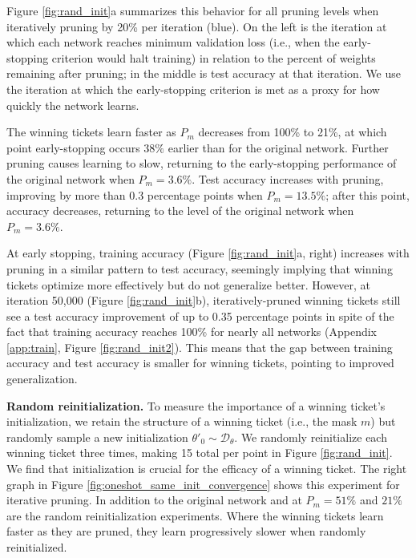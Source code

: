 Figure \ref{fig:rand_init}a summarizes this behavior for all pruning levels when iteratively pruning by 20\% per iteration (blue).
On the left is the iteration at which each network reaches minimum validation loss (i.e., when the early-stopping criterion would halt training)
in relation to the percent of weights remaining after pruning; in the middle is test accuracy at that iteration. We use the iteration at which
the early-stopping criterion is met as a proxy for how quickly the network learns.

The winning tickets learn faster as $P_m$ decreases from 100\% to 21\%, at which point
early-stopping occurs $38\%$ earlier than for the original network. Further pruning causes
learning to slow, returning to the early-stopping performance of the original network when $P_m = 3.6\%$.
Test accuracy increases with pruning, improving by more than 0.3 percentage points when $P_m = 13.5\%$; after this point, accuracy decreases, returning to the level of the original network when $P_m = 3.6\%$.

At early stopping, training accuracy (Figure \ref{fig:rand_init}a, right) increases with pruning in a similar pattern to test accuracy, seemingly implying that winning tickets
optimize more effectively but do not generalize better.  However, at iteration 50,000 (Figure \ref{fig:rand_init}b),
iteratively-pruned winning tickets still see a test accuracy improvement of up to 0.35 percentage points in spite of the fact that
training accuracy reaches 100\% for nearly all networks (Appendix \ref{app:train}, Figure \ref{fig:rand_init2}). This means that the gap between
training accuracy and test accuracy is smaller for winning tickets, pointing to improved generalization.

\textbf{Random reinitialization.} To measure the importance of a winning ticket's
initialization, we retain the structure of a winning ticket (i.e., the mask $m$) but randomly sample a new initialization $\theta'_0 \sim \mathcal{D}_\theta$.
We randomly reinitialize each winning ticket three times, making 15 total per point in Figure \ref{fig:rand_init}. We find
that initialization is crucial for the efficacy of a winning ticket.
The right graph in Figure \ref{fig:oneshot_same_init_convergence} shows this experiment for iterative pruning.
In addition to the original network and {} at $P_m = 51\%$ and $21\%$ are the random reinitialization experiments.
Where the winning tickets learn faster as they are pruned, they learn progressively slower when randomly reinitialized.

